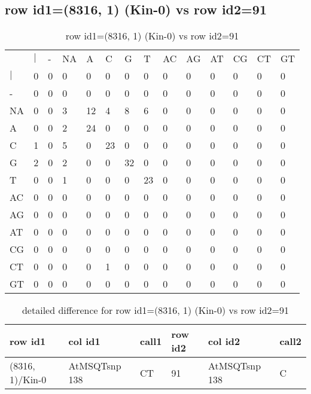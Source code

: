 \subsection{row id1=(8316, 1) (Kin-0) vs row id2=91}
\begin{center}
\begin{longtable}{|l|l|l|l|l|l|l|l|l|l|l|l|l|l|}
\caption{row id1=(8316, 1) (Kin-0) vs row id2=91} \label{table_dm310}\\
\hline
\\
\hline
&$|$&-&NA&A&C&G&T&AC&AG&AT&CG&CT&GT\\
$|$&0&0&0&0&0&0&0&0&0&0&0&0&0\\
-&0&0&0&0&0&0&0&0&0&0&0&0&0\\
NA&0&0&3&12&4&8&6&0&0&0&0&0&0\\
A&0&0&2&24&0&0&0&0&0&0&0&0&0\\
C&1&0&5&0&23&0&0&0&0&0&0&0&0\\
G&2&0&2&0&0&32&0&0&0&0&0&0&0\\
T&0&0&1&0&0&0&23&0&0&0&0&0&0\\
AC&0&0&0&0&0&0&0&0&0&0&0&0&0\\
AG&0&0&0&0&0&0&0&0&0&0&0&0&0\\
AT&0&0&0&0&0&0&0&0&0&0&0&0&0\\
CG&0&0&0&0&0&0&0&0&0&0&0&0&0\\
CT&0&0&0&0&1&0&0&0&0&0&0&0&0\\
GT&0&0&0&0&0&0&0&0&0&0&0&0&0\\
\hline
\end{longtable}
\end{center}

\begin{center}
\begin{longtable}{|l|l|l|l|l|l|}
\caption{detailed difference for row id1=(8316, 1) (Kin-0) vs row id2=91} \label{table_dm311}\\
\hline
row id1&col id1&call1&row id2&col id2&call2\\
\hline
(8316, 1)/Kin-0&AtMSQTsnp 138&CT&91&AtMSQTsnp 138&C\\
\hline
\end{longtable}
\end{center}

